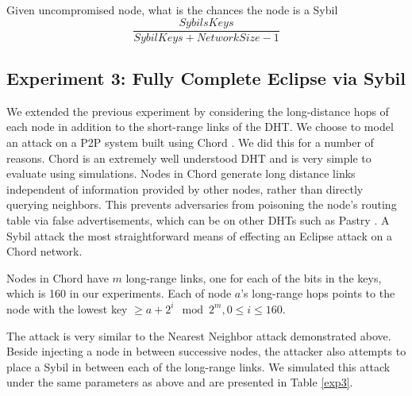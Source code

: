 \documentclass[a4paper]{article}
\begin{document}
Given uncompromised node, what is the chances the node is a Sybil
$$ \frac{SybilsKeys}{SybilKeys + NetworkSize -1}  $$

\subsection{Experiment 3: Fully Complete Eclipse via Sybil}
We extended the previous experiment by considering the long-distance hops of each node in addition to the short-range links of the DHT.
We choose to model an attack on a P2P system built using Chord \cite{chord}.
We did this for a number of reasons.
Chord is an extremely well understood DHT and is very simple to evaluate using simulations.
Nodes in Chord generate long distance links independent of information provided by other nodes, rather than directly querying neighbors.
This prevents adversaries from poisoning the node's routing table via false advertisements, which can be on other DHTs such as Pastry \cite{pastry}. 
A Sybil attack the most straightforward means of effecting an Eclipse attack on a Chord network.

Nodes in Chord have $m$ long-range links, one for each of the bits in the keys, which is 160 in our experiments.
Each of node $a$'s long-range hops points to the node with the lowest key $\geq a + 2^{i} \mod 2^{m} , 0 \leq i \leq 160$.


The attack is very similar to the Nearest Neighbor attack demonstrated above.
Beside injecting a node in between successive nodes, the attacker also attempts to place a Sybil in between each of the long-range links.
We simulated this attack under the same parameters as above and are presented in Table \ref{exp3}.
\end{document}
